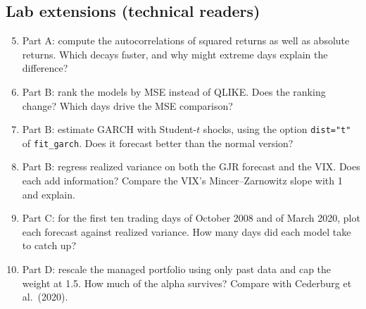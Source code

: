 \subsection*{Lab extensions (technical readers)}

\begin{enumerate}
  \setcounter{enumi}{4}
  \item Part A: compute the autocorrelations of squared returns as well as absolute returns. Which decays faster, and why might extreme days explain the difference?
  \item Part B: rank the models by MSE instead of QLIKE. Does the ranking change? Which days drive the MSE comparison?
  \item Part B: estimate GARCH with Student-$t$ shocks, using the option \texttt{dist="t"} of \texttt{fit\_garch}. Does it forecast better than the normal version?
  \item Part B: regress realized variance on both the GJR forecast and the VIX. Does each add information? Compare the VIX's Mincer--Zarnowitz slope with 1 and explain.
  \item Part C: for the first ten trading days of October 2008 and of March 2020, plot each forecast against realized variance. How many days did each model take to catch up?
  \item Part D: rescale the managed portfolio using only past data and cap the weight at 1.5. How much of the alpha survives? Compare with Cederburg et al.\ (2020).
\end{enumerate}
